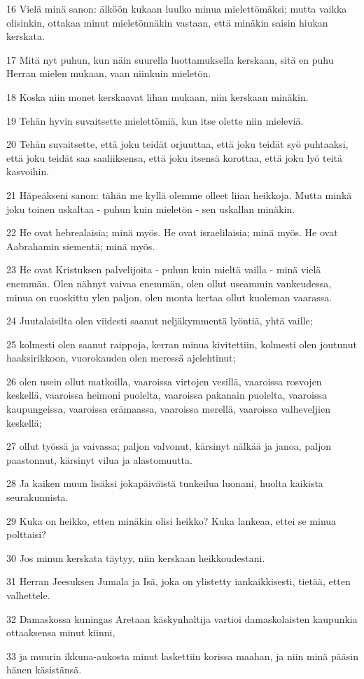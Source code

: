 \par 16 Vielä minä sanon: älköön kukaan luulko minua mielettömäksi; mutta vaikka olisinkin, ottakaa minut mieletönnäkin vastaan, että minäkin saisin hiukan kerskata.
\par 17 Mitä nyt puhun, kun näin suurella luottamuksella kerskaan, sitä en puhu Herran mielen mukaan, vaan niinkuin mieletön.
\par 18 Koska niin monet kerskaavat lihan mukaan, niin kerskaan minäkin.
\par 19 Tehän hyvin suvaitsette mielettömiä, kun itse olette niin mieleviä.
\par 20 Tehän suvaitsette, että joku teidät orjuuttaa, että joku teidät syö puhtaaksi, että joku teidät saa saaliiksensa, että joku itsensä korottaa, että joku lyö teitä kasvoihin.
\par 21 Häpeäkseni sanon: tähän me kyllä olemme olleet liian heikkoja. Mutta minkä joku toinen uskaltaa - puhun kuin mieletön - sen uskallan minäkin.
\par 22 He ovat hebrealaisia; minä myös. He ovat israelilaisia; minä myös. He ovat Aabrahamin siementä; minä myös.
\par 23 He ovat Kristuksen palvelijoita - puhun kuin mieltä vailla - minä vielä enemmän. Olen nähnyt vaivaa enemmän, olen ollut useammin vankeudessa, minua on ruoskittu ylen paljon, olen monta kertaa ollut kuoleman vaarassa.
\par 24 Juutalaisilta olen viidesti saanut neljäkymmentä lyöntiä, yhtä vaille;
\par 25 kolmesti olen saanut raippoja, kerran minua kivitettiin, kolmesti olen joutunut haaksirikkoon, vuorokauden olen meressä ajelehtinut;
\par 26 olen usein ollut matkoilla, vaaroissa virtojen vesillä, vaaroissa rosvojen keskellä, vaaroissa heimoni puolelta, vaaroissa pakanain puolelta, vaaroissa kaupungeissa, vaaroissa erämaassa, vaaroissa merellä, vaaroissa valheveljien keskellä;
\par 27 ollut työssä ja vaivassa; paljon valvonut, kärsinyt nälkää ja janoa, paljon paastonnut, kärsinyt vilua ja alastomuutta.
\par 28 Ja kaiken muun lisäksi jokapäiväistä tunkeilua luonani, huolta kaikista seurakunnista.
\par 29 Kuka on heikko, etten minäkin olisi heikko? Kuka lankeaa, ettei se minua polttaisi?
\par 30 Jos minun kerskata täytyy, niin kerskaan heikkoudestani.
\par 31 Herran Jeesuksen Jumala ja Isä, joka on ylistetty iankaikkisesti, tietää, etten valhettele.
\par 32 Damaskossa kuningas Aretaan käskynhaltija vartioi damaskolaisten kaupunkia ottaaksensa minut kiinni,
\par 33 ja muurin ikkuna-aukosta minut laskettiin korissa maahan, ja niin minä pääsin hänen käsistänsä.

